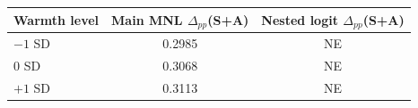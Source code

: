 \begin{tabular}{lcc}
\toprule
Warmth level & Main MNL $\Delta_{pp}$(S+A) & Nested logit $\Delta_{pp}$(S+A) \\
\midrule
$-1$ SD & 0.2985 & NE \\
$0$ SD & 0.3068 & NE \\
$+1$ SD & 0.3113 & NE \\
\bottomrule
\end{tabular}
